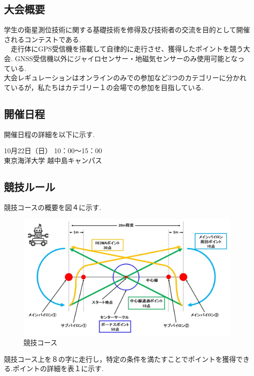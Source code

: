 \documentclass[submit,techrep,noauthor]{ipsj}
\begin{document}
\subsection{大会概要}
学生の衛星測位技術に関する基礎技術を修得及び技術者の交流を目的として開催されるコンテストである.\\
　走行体にGPS受信機を搭載して自律的に走行させ、獲得したポイントを競う大会.
 GNSS受信機以外にジャイロセンサー・地磁気センサーのみ使用可能となっている.\\
 大会レギュレーションはオンラインのみでの参加など3つのカテゴリーに分かれているが，私たちはカテゴリー１の会場での参加を目指している.
 
 \subsection{開催日程}
 開催日程の詳細を以下に示す.
 
 10月22日（日） 10：00～15：00\\
 東京海洋大学  越中島キャンパス


\subsection{競技ルール}
競技コースの概要を図４に示す.



\begin{figure}[h]
 \centering
   \includegraphics[scale=0.23]{rules.jpg}
 \caption{競技コース}
 \label{大会ルール}
\end{figure}

競技コース上を８の字に走行し，特定の条件を満たすことでポイントを獲得できる.ポイントの詳細を表１に示す.
 
\end{document}
